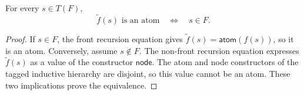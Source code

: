 \begin{lemma}
For every $s\in T(F)$,
\[
  \widetilde f(s)\text{ is an atom}
  \quad\Longleftrightarrow\quad s\in F.
\]
\end{lemma}
\begin{proof}
If $s\in F$, the front recursion equation
 gives
$\widetilde f(s)=\mathsf{atom}(f(s))$, so it is an atom.  Conversely, assume
$s\notin F$.  The non-front recursion equation
 expresses $\widetilde f(s)$ as a value of
the constructor $\mathsf{node}$.  The atom and node constructors of the
tagged inductive hierarchy  are disjoint, so this value
cannot be an atom.  These two implications prove the equivalence.
\end{proof}

